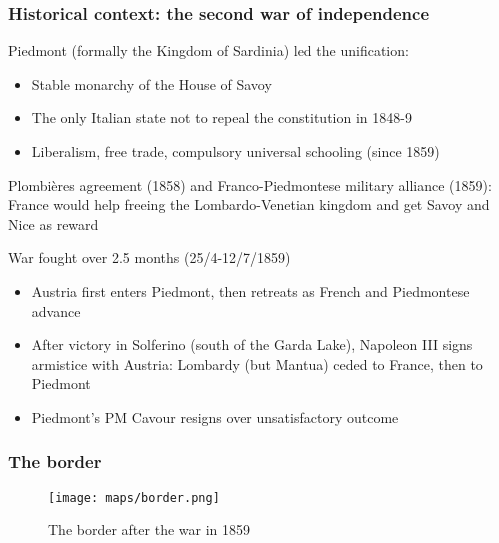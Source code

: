 \documentclass[10pt]{beamer}
\begin{document}
\begin{frame}
    \frametitle{Historical context: the second war of independence}
    
    Piedmont (formally the Kingdom of Sardinia) led the unification:
    \begin{itemize}
        \item Stable monarchy of the House of Savoy
        \item The only Italian state not to repeal the constitution in 1848-9
        \item Liberalism, free trade, compulsory universal schooling (since 1859)
    \end{itemize}

    \pause
    
    \bigskip

    Plombières agreement (1858) and Franco-Piedmontese military alliance (1859): France would help freeing the Lombardo-Venetian kingdom and get Savoy and Nice as reward

    \bigskip
    War fought over 2.5 months (25/4-12/7/1859)
    \begin{itemize}
        \item Austria first enters Piedmont, then retreats as French and Piedmontese advance
        \item After victory in Solferino (south of the Garda Lake), Napoleon III signs armistice with Austria: Lombardy (but Mantua) ceded to France, then to Piedmont
        \item Piedmont's PM Cavour resigns over unsatisfactory outcome
    \end{itemize}
    
\end{frame}

\begin{frame}
    \frametitle{The border}

    \begin{figure}
        \centering
        \texttt{[image: maps/border.png]}
        \caption{The border after the war in 1859}
        \label{fig:border}
    \end{figure}

\end{frame}
\end{document}

